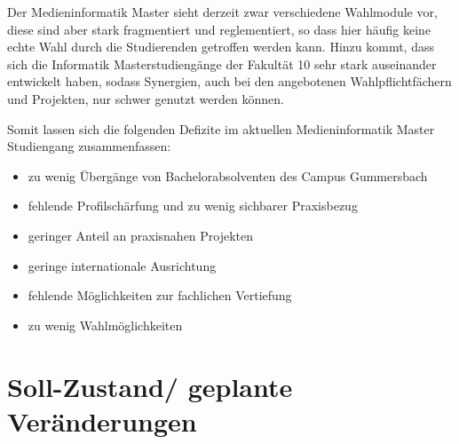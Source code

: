 Der Medieninformatik Master sieht derzeit zwar verschiedene Wahlmodule
vor, diese sind aber stark fragmentiert und reglementiert, so dass hier
häufig keine echte Wahl durch die Studierenden getroffen werden kann.
Hinzu kommt, dass sich die Informatik Masterstudiengänge der Fakultät 10
sehr stark auseinander entwickelt haben, sodass Synergien, auch bei den
angebotenen Wahlpflichtfächern und Projekten, nur schwer genutzt werden
können.

Somit lassen sich die folgenden Defizite im aktuellen Medieninformatik
Master Studiengang zusammenfassen:

\begin{itemize}
\tightlist
\item
  zu wenig Übergänge von Bachelorabsolventen des Campus Gummersbach
\item
  fehlende Profilschärfung und zu wenig sichbarer Praxisbezug
\item
  geringer Anteil an praxisnahen Projekten
\item
  geringe internationale Ausrichtung
\item
  fehlende Möglichkeiten zur fachlichen Vertiefung
\item
  zu wenig Wahlmöglichkeiten
\end{itemize}

\chapter{Soll-Zustand/ geplante
Veränderungen\label{/mi-2017/selbstbericht/0150-soll-zustand-geplante-veraenderungen/0000-geplante-veraenderungen-bachelor}}\label{soll-zustand-geplante-veruxe4nderungenpathlabelmi-2017selbstbericht0150-soll-zustand-geplante-veraenderungen0000-geplante-veraenderungen-bachelor}

